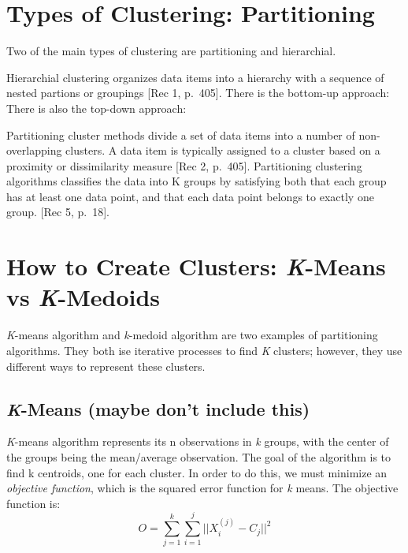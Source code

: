 \documentclass[12pt,twoside]{amherstthesis}
\begin{document}
  \section{Types of Clustering:
  Partitioning}\label{types-of-clustering-partitioning}
  
  Two of the main types of clustering are partitioning and hierarchial.
  
  Hierarchial clustering organizes data items into a hierarchy with a
  sequence of nested partions or groupings {[}Rec 1, p.~405{]}. There is
  the bottom-up approach: There is also the top-down approach:
  
  Partitioning cluster methods divide a set of data items into a number of
  non-overlapping clusters. A data item is typically assigned to a cluster
  based on a proximity or dissimilarity measure {[}Rec 2, p.~405{]}.
  Partitioning clustering algorithms classifies the data into K groups by
  satisfying both that each group has at least one data point, and that
  each data point belongs to exactly one group. {[}Rec 5, p.~18{]}.
  
  \section{\texorpdfstring{How to Create Clusters: \emph{K}-Means vs
  \emph{K}-Medoids}{How to Create Clusters: K-Means vs K-Medoids}}\label{how-to-create-clusters-k-means-vs-k-medoids}
  
  \emph{K}-means algorithm and \emph{k}-medoid algorithm are two examples
  of partitioning algorithms. They both ise iterative processes to find
  \emph{K} clusters; however, they use different ways to represent these
  clusters.
  
  \subsection{\texorpdfstring{\emph{K}-Means (maybe don't include
  this)}{K-Means (maybe don't include this)}}\label{k-means-maybe-dont-include-this}
  
  \emph{K}-means algorithm represents its n observations in \emph{k}
  groups, with the center of the groups being the mean/average
  observation. The goal of the algorithm is to find k centroids, one for
  each cluster. In order to do this, we must minimize an \emph{objective
  function}, which is the squared error function for \emph{k} means. The
  objective function is:
  \[O= \sum_{j=1}^k \sum_{i=1}^j ||{{X_i^{(j)}- C_j}}||^2\]
  
\end{document}
